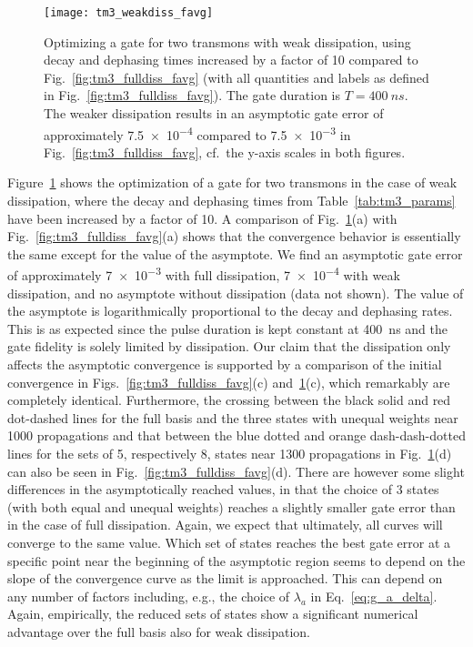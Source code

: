 \begin{figure}[tb] %
  \centering
 \texttt{[image: tm3\_weakdiss\_favg]}
 \caption{Optimizing a \sqrtISWAP{} gate for two transmons with weak
   dissipation, using
   decay and dephasing times increased by a factor of 10 compared to
   Fig.~\ref{fig:tm3_fulldiss_favg} (with all quantities and
   labels as defined in Fig.~\ref{fig:tm3_fulldiss_favg}). The gate duration
   is $T=\SI{400}{ns}$.  The weaker dissipation results in an asymptotic gate error of
   approximately \num{7.5e-4} compared to \num{7.5e-3} in
   Fig.~\ref{fig:tm3_fulldiss_favg}, cf.\ the y-axis scales in
   both figures.
   }
 \label{fig:tm3_weakdiss_favg}
\end{figure}
Figure~\ref{fig:tm3_weakdiss_favg} shows the optimization of
a \sqrtISWAP{} gate for two transmons in the
case of weak dissipation, where the decay and dephasing times from
Table~\ref{tab:tm3_params} have been increased by a factor of 10. A comparison of
Fig.~\ref{fig:tm3_weakdiss_favg}(a) with
Fig.~\ref{fig:tm3_fulldiss_favg}(a) shows that the
convergence
behavior is essentially the same except for the value of the asymptote. We find
an asymptotic gate error of approximately \num{7e-3} with full
dissipation, \num{7e-4} with weak dissipation, and no asymptote without
dissipation (data not shown). The value of the asymptote is logarithmically
proportional to the decay and dephasing rates. This is as expected
since the pulse duration is kept constant at \SI{400}{ns} and the gate
fidelity is solely limited by
dissipation. Our claim that the dissipation only affects the asymptotic
convergence is supported by a comparison of the initial convergence
in Figs.~\ref{fig:tm3_fulldiss_favg}(c)
and~\ref{fig:tm3_weakdiss_favg}(c),
which remarkably are completely identical.
Furthermore, the crossing between the black solid and red dot-dashed lines for
the full basis and the three states with unequal weights near 1000 propagations
and that between the blue dotted and orange dash-dash-dotted lines for the sets
of 5, respectively 8, states near
1300 propagations in Fig.~\ref{fig:tm3_weakdiss_favg}(d) can
also be seen in Fig.~\ref{fig:tm3_fulldiss_favg}(d).
There are however some slight differences in the asymptotically reached values,
in that the choice of 3 states (with both equal and unequal weights) reaches a slightly
smaller gate error than in the case of full dissipation. Again, we expect that
ultimately, all curves will converge to the same value. Which set of states
reaches the best gate error at a specific point near the beginning of the
asymptotic region seems to depend on the slope of the convergence curve as the
limit is approached. This can depend on any number of factors
including, e.g., the choice
of $\lambda_a$ in Eq.~\eqref{eq:g_a_delta}. Again, empirically, the reduced sets of
states show a significant numerical advantage over the full basis also
for weak dissipation.

